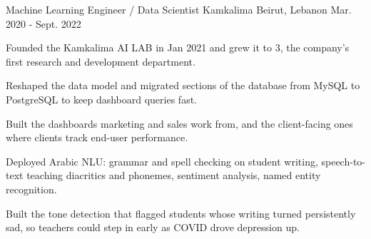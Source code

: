 \begin{cventries}
  \cventry
    {Machine Learning Engineer / Data Scientist} %
    {Kamkalima} %
    {Beirut, Lebanon} %
    {Mar. 2020 - Sept. 2022} %
    {
      \begin{cvitems} %
        \item{Founded the Kamkalima AI LAB in Jan 2021 and grew it to 3, the company's first research and development department.}
        \item{Reshaped the data model and migrated sections of the database from MySQL to PostgreSQL to keep dashboard queries fast.}
        \item{Built the dashboards marketing and sales work from, and the \mbox{client-facing} ones where clients track \mbox{end-user} performance.}
        \item{Deployed Arabic NLU: grammar and spell checking on student writing, \mbox{speech-to-text} teaching diacritics and phonemes, sentiment analysis, named entity recognition.}
        \item{Built the tone detection that flagged students whose writing turned persistently sad, so teachers could step in early as COVID drove depression up.}
      \end{cvitems}
    }


\end{cventries}
